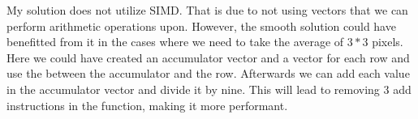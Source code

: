 My solution does not utilize SIMD. That is due to not using vectors that we can perform arithmetic operations upon. However, the smooth
solution could have benefitted from it in the cases where we need to take the average of $3 * 3$ pixels. Here we could have created an accumulator vector
and a vector for each row and use the \code{+} between the accumulator and the row. Afterwards we can add each value in the accumulator vector and divide it by nine.
This will lead to removing 3 add instructions in the  function, making it more performant.
